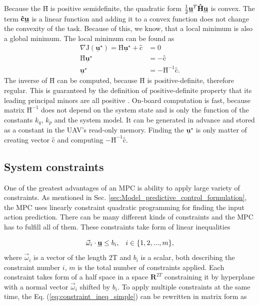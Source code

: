 \documentclass[a4paper,11pt,titlepage]{article}
\newcommand{\uvec}{\textbf{\underline{u}}}
\newcommand{\macoi}{\vec{\omega}_i}
\begin{document}
Because the  $\textbf{\^H}$ is positive semidefinite, the quadratic form $\frac{1}{2}\uvec^T\textbf{\^H}\uvec$ is convex. The term $\textbf{\^c} \uvec$ is a linear function and adding it to a convex function does not change the convexity of the task. Because of this, we know, that a local minimum is also a global minimum. The local minimum can be found as 
\begin{equation}
\label{eq:J_local_min}
\begin{split}
\nabla\mathrm{J}(\underline{\textbf{u}}^{\star}) = \textbf{\^H}\underline{\textbf{u}}^{\star} + \textbf{\^c} &= 0 \\
\textbf{\^H}\underline{\textbf{u}}^{\star} &= - \textbf{\^c} \\
\underline{\textbf{u}}^{\star} &= -\textbf{\^H}^{-1}\textbf{\^c}.
\end{split}
\end{equation}
The inverse of $\textbf{\^H}$ can be computed, because $\textbf{\^H}$ is positive-definite, therefore regular. This is guaranteed by the definition of positive-definite property that its leading principal minors are all positive \cite{chong2013introduction}. On-board computation is fast, because matrix $\textbf{\^H}^{-1}$ does not depend on the system state and is only the function of the constants $k_q$, $k_p$ and the system model. It can be generated in advance and stored as a constant in the UAV's read-only memory. Finding the $\underline{\textbf{u}}^{\star}$ is only matter of creating vector $\textbf{\^c}$ and computing $-\textbf{\^H}^{-1}\textbf{\^c}$.


\subsection{System constraints} \label{sec:system_constraints}
One of the greatest advantages of an MPC is ability to apply large variety of constraints. As mentioned in Sec. \ref{sec:Model_predictive_control_formulation}, the MPC uses linearly constraint quadratic programming for finding the input action prediction. There can be many different kinds of constraints and the MPC has to fulfill all of them. These constraints take form of linear inequalities

\begin{equation}
\label{eq:constraint_ineq_simple}
\macoi \cdot \uvec \leq b_i, \;\;\; i \in \{1, 2, ..., m\},
\end{equation}
where $\vec{\omega}_i$ is a vector of the length 2T and $b_i$ is a scalar, both describing the constraint number $i$, $m$ is the total number of constraints applied. Each constraint takes form of a half space in a space $\textbf{R}^{2T}$ constraining it by hyperplane with a normal vector $\vec{\omega}_i$ shifted by $b_i$. To apply multiple constraints at the same time, the Eq. (\ref{eq:constraint_ineq_simple}) can be rewritten in matrix form as 
\end{document}
